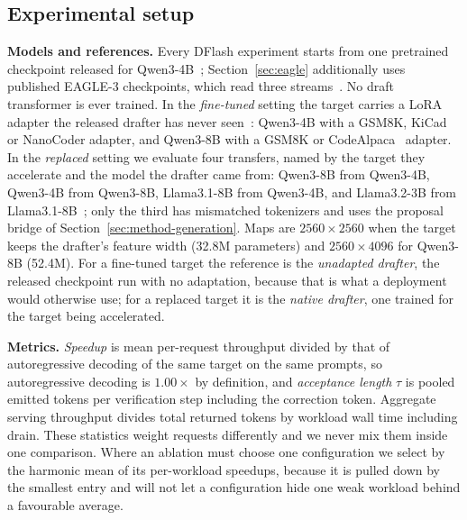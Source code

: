 \subsection{Experimental setup}
\label{sec:setup}

\textbf{Models and references.} Every DFlash experiment starts from one pretrained checkpoint released for Qwen3-4B~\citep{chen2026dflash,yang2025qwen3}; Section~\ref{sec:eagle} additionally uses published EAGLE-3 checkpoints, which read three streams~\citep{li2025eagle3}. No draft transformer is ever trained. In the \emph{fine-tuned} setting the target carries a LoRA adapter the released drafter has never seen~\citep{hu2022lora}: Qwen3-4B with a GSM8K, KiCad or NanoCoder adapter, and Qwen3-8B with a GSM8K or CodeAlpaca~\citep{chaudhary2023codealpaca} adapter. In the \emph{replaced} setting we evaluate four transfers, named by the target they accelerate and the model the drafter came from: Qwen3-8B from Qwen3-4B, Qwen3-4B from Qwen3-8B, Llama3.1-8B from Qwen3-4B, and Llama3.2-3B from Llama3.1-8B~\citep{grattafiori2024llama3}; only the third has mismatched tokenizers and uses the proposal bridge of Section~\ref{sec:method-generation}. Maps are $2560\times2560$ when the target keeps the drafter's feature width (32.8M parameters) and $2560\times4096$ for Qwen3-8B (52.4M). For a fine-tuned target the reference is the \emph{unadapted drafter}, the released checkpoint run with no adaptation, because that is what a deployment would otherwise use; for a replaced target it is the \emph{native drafter}, one trained for the target being accelerated.

\textbf{Metrics.} \emph{Speedup} is mean per-request throughput divided by that of autoregressive decoding of the same target on the same prompts, so autoregressive decoding is $1.00\times$ by definition, and \emph{acceptance length} $\tau$ is pooled emitted tokens per verification step including the correction token. Aggregate serving throughput divides total returned tokens by workload wall time including drain. These statistics weight requests differently and we never mix them inside one comparison. Where an ablation must choose one configuration we select by the harmonic mean of its per-workload speedups, because it is pulled down by the smallest entry and will not let a configuration hide one weak workload behind a favourable average.

